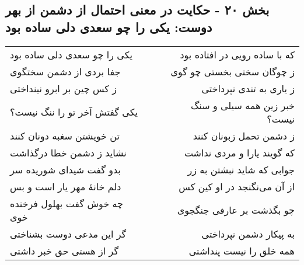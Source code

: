 \begin{center}
\section*{بخش ۲۰ - حکایت در معنی احتمال از دشمن از بهر دوست: یکی را چو سعدی دلی ساده بود}
\label{sec:020}
\begin{longtable}{l p{0.5cm} r}
یکی را چو سعدی دلی ساده بود
&&
که با ساده رویی در افتاده بود
\\
جفا بردی از دشمن سختگوی
&&
ز چوگان سختی بخستی چو گوی
\\
ز کس چین بر ابرو نینداختی
&&
ز یاری به تندی نپرداختی
\\
یکی گفتش آخر تو را ننگ نیست؟
&&
خبر زین همه سیلی و سنگ نیست؟
\\
تن خویشتن سغبه دونان کنند
&&
ز دشمن تحمل زبونان کنند
\\
نشاید ز دشمن خطا درگذاشت
&&
که گویند یارا و مردی نداشت
\\
بدو گفت شیدای شوریده سر
&&
جوابی که شاید نبشتن به زر
\\
دلم خانهٔ مهر یار است و بس
&&
از آن می‌نگنجد در او کین کس
\\
چه خوش گفت بهلول فرخنده خوی
&&
چو بگذشت بر عارفی جنگجوی
\\
گر این مدعی دوست بشناختی
&&
به پیکار دشمن نپرداختی
\\
گر از هستی حق خبر داشتی
&&
همه خلق را نیست پنداشتی
\\
\end{longtable}
\end{center}
